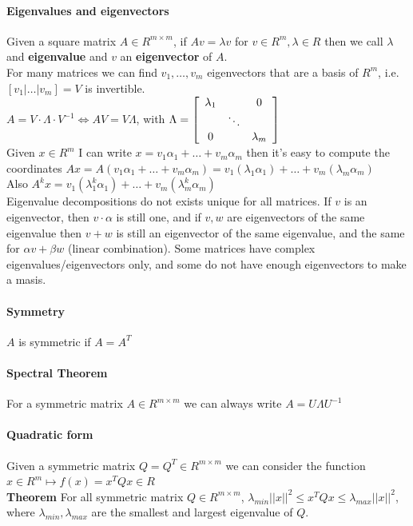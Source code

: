 \documentclass[10pt]{report}
\begin{document}
\paragraph{Eigenvalues and eigenvectors} Given a square matrix $A\in R^{m\times m}$, if $Av = \lambda v$ for $v\in R^m, \lambda\in R$ then we call $\lambda$ and \textbf{eigenvalue} and $v$ an \textbf{eigenvector} of $A$.\\
For many matrices we can find $v_1,\ldots,v_m$ eigenvectors that are a basis of $R^m$, i.e. $[v_1|\ldots|v_m] = V$ is invertible.\\
$A = V\cdot\Lambda\cdot V^{-1}\Leftrightarrow AV = V\Lambda$, with $\Lambda = \left[\begin{array}{c c c}
\lambda_1 & & 0\\
& \ddots \\
0& & \lambda_m
\end{array}\right]$\\
Given $x\in R^m$ I can write $x = v_1\alpha_1 + \ldots + v_m\alpha_m$ then it's easy to compute the coordinates $Ax = A(v_1\alpha_1 + \ldots + v_m\alpha_m) = v_1(\lambda_1\alpha_1) + \ldots + v_m(\lambda_m\alpha_m)$\\
Also $A^kx = v_1(\lambda_1^k\alpha_1) + \ldots + v_m(\lambda_m^k\alpha_m)$\\
Eigenvalue decompositions do not exists unique for all matrices. If $v$ is an eigenvector, then $v\cdot\alpha$ is still one, and if $v,w$ are eigenvectors of the same eigenvalue then $v+w$ is still an eigenvector of the same eigenvalue, and the same for $\alpha v+\beta w$ (linear combination). Some matrices have complex eigenvalues/eigenvectors only, and some do not have enough eigenvectors to make a masis.
\paragraph{Symmetry} $A$ is symmetric if $A = A^T$
\paragraph{Spectral Theorem} For a symmetric matrix $A\in R^{m\times m}$ we can always write $A = U\Lambda U^{-1}$
\paragraph{Quadratic form} Given a symmetric matrix $Q = Q^T \in R^{m\times m}$ we can consider the function $x\in R^m\mapsto f(x) = x^T Qx \in R$\\
\textbf{Theorem} For all symmetric matrix $Q \in R^{m\times m}$, $\lambda_{min}||x||^2 \leq x^TQx\leq \lambda_{max}||x||^2$, where $\lambda_{min}, \lambda_{max}$ are the smallest and largest eigenvalue of $Q$.
\end{document}
